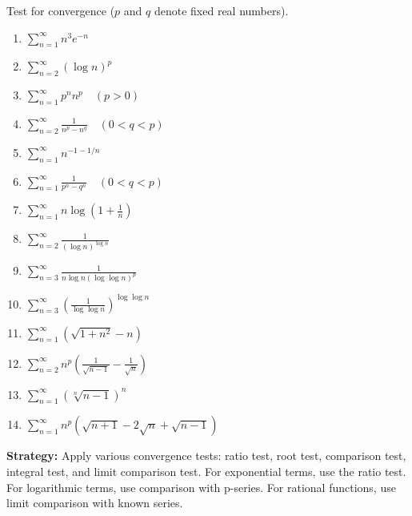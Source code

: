 \begin{problembox}
Test for convergence (\(p\) and \(q\) denote fixed real numbers).
\begin{enumerate}[label=\alph*)]
\item \(\sum_{n=1}^{\infty} n^3 e^{-n}\)
\item \(\sum_{n=2}^{\infty} (\log n)^p\)
\item \(\sum_{n=1}^{\infty} p^n n^p \quad (p > 0)\)
\item \(\sum_{n=2}^{\infty} \frac{1}{n^p - n^q} \quad (0 < q < p)\)
\item \(\sum_{n=1}^{\infty} n^{-1-1/n}\)
\item \(\sum_{n=1}^{\infty} \frac{1}{p^n - q^n} \quad (0 < q < p)\)
\item \(\sum_{n=1}^{\infty} n \log \left(1 + \frac{1}{n}\right)\)
\item \(\sum_{n=2}^{\infty} \frac{1}{(\log n)^{\log n}}\)
\item \(\sum_{n=3}^{\infty} \frac{1}{n \log n (\log \log n)^p}\)
\item \(\sum_{n=3}^{\infty} \left( \frac{1}{\log \log n} \right)^{\log \log n}\)
\item \(\sum_{n=1}^{\infty} (\sqrt{1 + n^2} - n)\)
\item \(\sum_{n=2}^{\infty} n^p \left( \frac{1}{\sqrt{n - 1}} - \frac{1}{\sqrt{n}} \right)\)
\item \(\sum_{n=1}^{\infty} (\sqrt[n]{n - 1})^n\)
\item \(\sum_{n=1}^{\infty} n^p (\sqrt{n + 1} - 2\sqrt{n} + \sqrt{n - 1})\)
\end{enumerate}
\end{problembox}

\noindent\textbf{Strategy:} Apply various convergence tests: ratio test, root test, comparison test, integral test, and limit comparison test. For exponential terms, use the ratio test. For logarithmic terms, use comparison with p-series. For rational functions, use limit comparison with known series.

